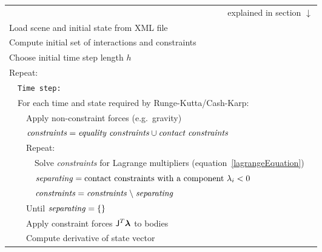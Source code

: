 \begin{figure}
\renewcommand{\baselinestretch}{1.3}\small\normalsize
\newcommand{\spx}{\vspace*{\baselineskip}\\}
\begin{tabular}{|l|l|l|l|@{}l}
\multicolumn{5}{r}{explained in section $\downarrow$}\\\cline{1-4}
\multicolumn{4}{|l|}{Load scene and initial state from XML file}&\hspace*{0.5cm}\\\cline{1-4}
\multicolumn{4}{|l|}{Compute initial set of interactions and constraints}\\\cline{1-4}
\multicolumn{4}{|l|}{Choose initial time step length $h$}\\\cline{1-4}
\multicolumn{4}{|l|}{Repeat:}\\\cline{2-4}
    &\multicolumn{3}{|l|}{\texttt{Time step:}}\\\cline{2-4}
    &\multicolumn{3}{|l|}{For each time and state required by Runge-Kutta/Cash-Karp:}\\\cline{3-4}
        &&\multicolumn{2}{|l|}{Apply non-constraint forces (e.g.\ gravity)}\\\cline{3-4}
        &&\multicolumn{2}{|l|}{$\mbox{\textit{constraints}} = \mbox{\textit{equality constraints}}
        \cup \mbox{\textit{contact constraints}}$}\\\cline{3-4}
        &&\multicolumn{2}{|l|}{Repeat:}\\\cline{4-4}
            &&&Solve \textit{constraints} for Lagrange multipliers (equation~\ref{lagrangeEquation})\\\cline{4-4}
            &&&$\mbox{\textit{separating}} = \mbox{contact constraints with a component } \lambda_i < 0$&
            \zerobox{b}{\mbox{$\left\}\ref{restingContact}\begin{array}{l}
            \spx\spx\spx\spx\spx\spx\spx\end{array}\right.$}}\\\cline{4-4}
            &&&$\mbox{\textit{constraints}} = \mbox{\textit{constraints}} \;\backslash\;
            \mbox{\textit{separating}}$\\\cline{4-4}
        &&\multicolumn{2}{|l|}{Until $\mbox{\textit{separating}} = \{\}$}\\\cline{3-4}
        &&\multicolumn{2}{|l|}{Apply constraint forces $\m{J}^T\ve{\lambda}$ to bodies}\\\cline{3-4}
        &&\multicolumn{2}{|l|}{Compute derivative of state vector}\\\cline{2-4}

\end{tabular}
\end{figure}
